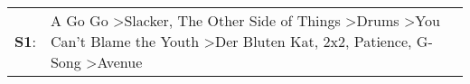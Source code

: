 \begin{supertabular}{p{0.03\textwidth}p{0.92\textwidth}}
 \textbf{S1}:  &  A Go Go\textsuperscript{} \textgreater \enspace Slacker\textsuperscript{}, \enspace The Other Side of Things\textsuperscript{} \textgreater \enspace Drums\textsuperscript{} \textgreater \enspace You Can't Blame the Youth\textsuperscript{} \textgreater \enspace Der Bluten Kat\textsuperscript{}, \enspace 2x2\textsuperscript{}, \enspace Patience\textsuperscript{}, \enspace G-Song\textsuperscript{} \textgreater \enspace Avenue\textsuperscript{}  \enspace  \\
\end{supertabular}
